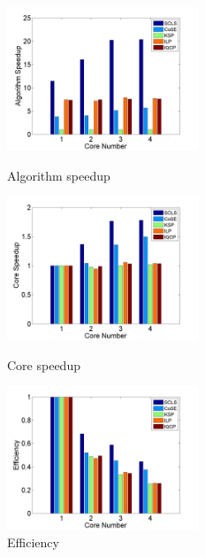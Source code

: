 \begin{figure}[tp]
\centering
\begin{minipage}[t]{0.3\linewidth}
\centering
\includegraphics[width=2.25in]{franz/Multiple}
\caption{Algorithm speedup}
\label{fig:Multiple}
\end{minipage}
\hfill
\begin{minipage}[t]{0.3\linewidth}
\centering
\includegraphics[width=2.25in]{franz/speedup}
\caption{Core speedup}
\label{fig:Speedup}
\end{minipage}
\hfill
\begin{minipage}[t]{0.3\linewidth}
\centering
\includegraphics[width=2.25in]{franz/Efficiency}
\caption{Efficiency}
\label{fig:Efficiency}
\end{minipage}
\end{figure}

%

